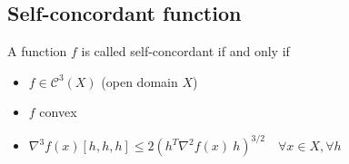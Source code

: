 %
%
%
%
%

\subsection{Self-concordant function}
\begin{definition}\label{Def:1D} A function $f$ is called self-concordant if and only if
\begin{itemize}
\item $f \in \mathcal{C}^3(X)$ (open domain $X$)
\item $f$ convex
\item $\nabla^3 f(x) [h,h,h] \leq 2 (h^T \nabla^2 f(x)\ h)^{3/2} \quad \forall x \in X, \forall h$
\end{itemize}
\end{definition}

